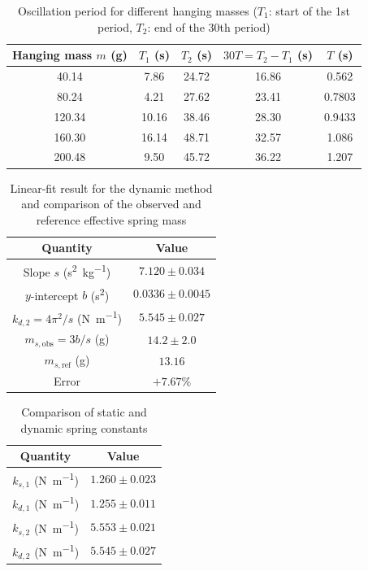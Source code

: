 \begin{table}[htb!]
\centering
\caption{Oscillation period for different hanging masses ($T_{1}$: start of the 1st period, $T_{2}$: end of the 30th period)}
\begin{tabular}{ccccc}
\toprule
Hanging mass $m$ (\unit{\g}) & $T_{1}$ (\unit{\s}) & $T_{2}$ (\unit{\s}) & $30T=T_{2}-T_{1}$ (\unit{\s}) & $T$ (\unit{\s}) \\
\midrule
40.14 & 7.86 & 24.72 & 16.86 & 0.562 \\
80.24 & 4.21 & 27.62 & 23.41 & 0.7803 \\
120.34 & 10.16 & 38.46 & 28.30 & 0.9433 \\
160.30 & 16.14 & 48.71 & 32.57 & 1.086 \\
200.48 & 9.50 & 45.72 & 36.22 & 1.207 \\
\bottomrule
\end{tabular}
\end{table}
\begin{table}[htb!]
\centering
\caption{Linear-fit result for the dynamic method and comparison of the observed and reference effective spring mass}
\begin{tabular}{cc}
\toprule
Quantity & Value \\
\midrule
Slope $s$ (\unit{\s\squared\per\kg}) & $7.120 \pm 0.034$ \\
$y$-intercept $b$ (\unit{\s\squared}) & $0.0336 \pm 0.0045$ \\
$k_{d,2}=4\pi^{2}/s$ (\unit{\N\per\m}) & $5.545 \pm 0.027$ \\
$m_{s,\text{obs}}=3b/s$ (\unit{\g}) & $14.2 \pm 2.0$ \\
$m_{s,\text{ref}}$ (\unit{\g}) & $13.16$ \\
Error & $+7.67\%$ \\
\bottomrule
\end{tabular}
\end{table}
\begin{table}[htb!]
\centering
\caption{Comparison of static and dynamic spring constants}
\begin{tabular}{cc}
\toprule
Quantity & Value \\
\midrule
$k_{s,1}$ (\unit{\N\per\m}) & $1.260 \pm 0.023$ \\
$k_{d,1}$ (\unit{\N\per\m}) & $1.255 \pm 0.011$ \\
$k_{s,2}$ (\unit{\N\per\m}) & $5.553 \pm 0.021$ \\
$k_{d,2}$ (\unit{\N\per\m}) & $5.545 \pm 0.027$ \\
\bottomrule
\end{tabular}
\end{table}
